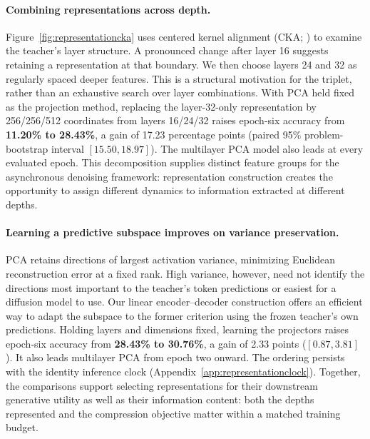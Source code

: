 \paragraph{Combining representations across depth.}
Figure~\ref{fig:representationcka} uses centered kernel alignment (CKA; \citealp{cka}) to examine the teacher's layer structure. A pronounced change after layer 16 suggests retaining a representation at that boundary. We then choose layers 24 and 32 as regularly spaced deeper features. This is a structural motivation for the triplet, rather than an exhaustive search over layer combinations. With PCA held fixed as the projection method, replacing the layer-32-only representation by 256/256/512 coordinates from layers 16/24/32 raises epoch-six accuracy from \textbf{11.20\% to 28.43\%}, a gain of 17.23 percentage points (paired 95\% problem-bootstrap interval $[15.50,18.97]$). The multilayer PCA model also leads at every evaluated epoch. This decomposition supplies distinct feature groups for the asynchronous denoising framework: representation construction creates the opportunity to assign different dynamics to information extracted at different depths.

\paragraph{Learning a predictive subspace improves on variance preservation.}
PCA retains directions of largest activation variance, minimizing Euclidean reconstruction error at a fixed rank. High variance, however, need not identify the directions most important to the teacher's token predictions or easiest for a diffusion model to use. Our linear encoder--decoder construction offers an efficient way to adapt the subspace to the former criterion using the frozen teacher's own predictions. Holding layers and dimensions fixed, learning the projectors raises epoch-six accuracy from \textbf{28.43\% to 30.76\%}, a gain of 2.33 points ($[0.87,3.81]$). It also leads multilayer PCA from epoch two onward. The ordering persists with the identity inference clock (Appendix~\ref{app:representationclock}). Together, the comparisons support selecting representations for their downstream generative utility as well as their information content: both the depths represented and the compression objective matter within a matched training budget.
